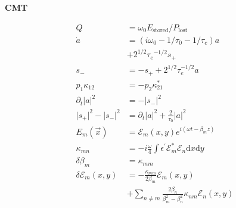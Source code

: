 \documentclass[12pt]{article}
\begin{document}
\begin{multicols}{2}
\textbf{CMT}

\begin{align}
  Q &= \omega_0 E_{\textrm{stored}}/P_{\textrm{lost}}\\
  \dot{a} &= (i\omega_0 - 1/\tau_0 - 1/\tau_e) a\\
  &+ 2^{1/2} {\tau_e}^{-1/2}s_+\\
  s_- &= -s_+ + 2^{1/2} \tau_e^{-1/2} a\\
  p_1 \kappa_{12} &= -p_2 \kappa_{21}^{*}\\
  \partial_t \lvert a \rvert^2 &= - \lvert s_- \rvert^2\\
  \lvert s_+ \rvert^2  - \lvert s_- \rvert^2 &= \partial_t \lvert a \rvert^2 + \frac{2}{\tau_0} \lvert a \rvert^2\\
  E_{m}(\vec{x}) &= \mathcal{E}_m(x, y)e^{i(\omega t - \beta_m z)}\\ %
  \kappa_{mn} &= -i \frac{\omega}{4} \int \epsilon^{'} \mathcal{E}_m^{*} \mathcal{E}_n \mathrm{d}x \mathrm{d}y\\
  \delta \beta_{m} &= \kappa_{mm}\\
  \delta \mathcal{E}_m(x, y) &= - \frac{\kappa_{mm}}{2\beta_{m}} \mathcal{E}_m(x, y)\\
         & + {\textstyle \sum_{n \neq m}} \frac{2\beta_n}{\beta_m^2-\beta_n^2}\kappa_{nm} \mathcal{E}_n(x, y) 
\end{align}

\end{multicols}
\end{document}
